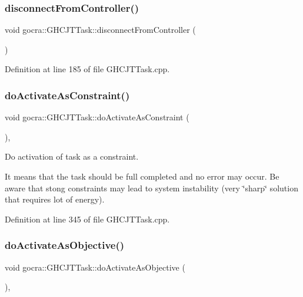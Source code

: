 \subsubsection{\texorpdfstring{disconnect\+From\+Controller()}{disconnectFromController()}}
{\footnotesize\ttfamily void gocra\+::\+G\+H\+C\+J\+T\+Task\+::disconnect\+From\+Controller (\begin{DoxyParamCaption}{ }\end{DoxyParamCaption})\hspace{0.3cm}{\ttfamily [protected]}}



Definition at line 185 of file G\+H\+C\+J\+T\+Task.\+cpp.

\hypertarget{classgocra_1_1GHCJTTask_a3fbf21222cf652bb5563b72416a97cda}{}\label{classgocra_1_1GHCJTTask_a3fbf21222cf652bb5563b72416a97cda} 
\subsubsection{\texorpdfstring{do\+Activate\+As\+Constraint()}{doActivateAsConstraint()}}
{\footnotesize\ttfamily void gocra\+::\+G\+H\+C\+J\+T\+Task\+::do\+Activate\+As\+Constraint (\begin{DoxyParamCaption}{ }\end{DoxyParamCaption})\hspace{0.3cm}{\ttfamily [protected]}, {\ttfamily [virtual]}}

Do activation of task as a constraint.

It means that the task should be full completed and no error may occur. Be aware that stong constraints may lead to system instability (very \char`\"{}sharp\char`\"{} solution that requires lot of energy). 

Definition at line 345 of file G\+H\+C\+J\+T\+Task.\+cpp.

\hypertarget{classgocra_1_1GHCJTTask_a81a6df22509e5e98902e5ac33a43dfed}{}\label{classgocra_1_1GHCJTTask_a81a6df22509e5e98902e5ac33a43dfed} 
\subsubsection{\texorpdfstring{do\+Activate\+As\+Objective()}{doActivateAsObjective()}}
{\footnotesize\ttfamily void gocra\+::\+G\+H\+C\+J\+T\+Task\+::do\+Activate\+As\+Objective (\begin{DoxyParamCaption}{ }\end{DoxyParamCaption})\hspace{0.3cm}{\ttfamily [protected]}, {\ttfamily [virtual]}}


